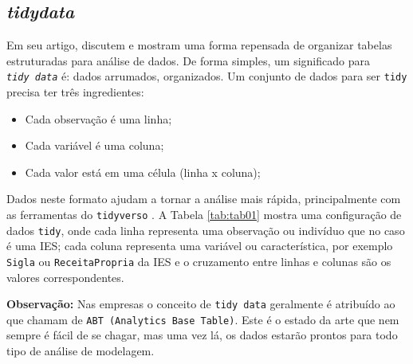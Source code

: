 \documentclass[12pt,]{style/krantz}
\makeatletter
\newenvironment{Shaded}{\begin{snugshade}}{\end{snugshade}}
\newcommand{\KeywordTok}[1]{\textcolor[rgb]{0.13,0.29,0.53}{\textbf{#1}}}
\newcommand{\DataTypeTok}[1]{\textcolor[rgb]{0.13,0.29,0.53}{#1}}
\newcommand{\DecValTok}[1]{\textcolor[rgb]{0.00,0.00,0.81}{#1}}
\newcommand{\StringTok}[1]{\textcolor[rgb]{0.31,0.60,0.02}{#1}}
\newcommand{\CommentTok}[1]{\textcolor[rgb]{0.56,0.35,0.01}{\textit{#1}}}
\newcommand{\OtherTok}[1]{\textcolor[rgb]{0.56,0.35,0.01}{#1}}
\newcommand{\OperatorTok}[1]{\textcolor[rgb]{0.81,0.36,0.00}{\textbf{#1}}}
\newcommand{\NormalTok}[1]{#1}
\providecommand{\tightlist}{%
  \setlength{\itemsep}{0pt}\setlength{\parskip}{0pt}}
\newenvironment{kframe}{%
\medskip{}
\setlength{\fboxsep}{.8em}
 \def\at@end@of@kframe{}%
 \ifinner\ifhmode%
  \def\at@end@of@kframe{\end{minipage}}%
  \begin{minipage}{\columnwidth}%
 \fi\fi%
 \def\FrameCommand##1{\hskip\@totalleftmargin \hskip-\fboxsep
 \colorbox{shadecolor}{##1}\hskip-\fboxsep
     \hskip-\linewidth \hskip-\@totalleftmargin \hskip\columnwidth}%
 \MakeFramed {\advance\hsize-\width
   \@totalleftmargin\z@ \linewidth\hsize
   \@setminipage}}%
 {\par\unskip\endMakeFramed%
 \at@end@of@kframe}
\renewenvironment{Shaded}{\begin{kframe}}{\end{kframe}}
\theoremstyle{definition}
\theoremstyle{definition}
\theoremstyle{definition}
\theoremstyle{remark}
\makeatother
\begin{document}
\subsection{\texorpdfstring{\emph{tidydata}}{tidydata}}\label{tidydata}

Em seu artigo, \citep{wickham2014tidy} discutem e mostram uma forma
repensada de organizar tabelas estruturadas para análise de dados. De
forma simples, um significado para \emph{\texttt{tidy\ data}} é: dados
arrumados, organizados. Um conjunto de dados para ser \texttt{tidy}
precisa ter três ingredientes:

\begin{itemize}
\tightlist
\item
  Cada observação é uma linha;
\item
  Cada variável é uma coluna;\\
\item
  Cada valor está em uma célula (linha x coluna);
\end{itemize}

Dados neste formato ajudam a tornar a análise mais rápida,
principalmente com as ferramentas do \texttt{tidyverso}
\citep{wickham2017tidyverse}. A Tabela \ref{tab:tab01} mostra uma
configuração de dados \texttt{tidy}, onde cada linha representa uma
observação ou indivíduo que no caso é uma IES; cada coluna representa
uma variável ou característica, por exemplo \texttt{Sigla} ou
\texttt{ReceitaPropria} da IES e o cruzamento entre linhas e colunas são
os valores correspondentes.

\textbf{Observação:} Nas empresas o conceito de \texttt{tidy\ data}
geralmente é atribuído ao que chamam de
\texttt{ABT\ (Analytics\ Base\ Table)}. Este é o estado da arte que nem
sempre é fácil de se chagar, mas uma vez lá, os dados estarão prontos
para todo tipo de análise de modelagem.

\begin{Shaded}
\end{Shaded}
\end{document}
